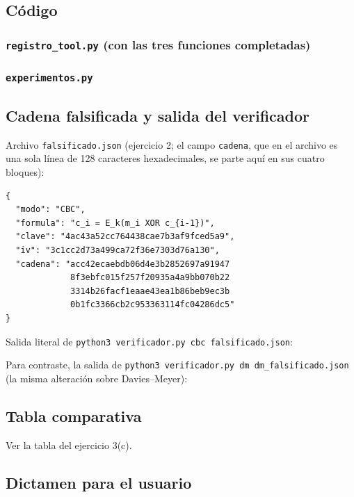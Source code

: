 \documentclass[11pt,letterpaper]{article}
\begin{document}
\subsection{Código}
\subsubsection*{\texttt{registro\_tool.py} (con las tres funciones completadas)}


\subsubsection*{\texttt{experimentos.py}}


\subsection{Cadena falsificada y salida del verificador}
Archivo \texttt{falsificado.json} (ejercicio 2; el campo \texttt{cadena}, que en el archivo es una sola
línea de 128 caracteres hexadecimales, se parte aquí en sus cuatro bloques):
\begin{lstlisting}[style=salida]
{
  "modo": "CBC",
  "formula": "c_i = E_k(m_i XOR c_{i-1})",
  "clave": "4ac43a52cc764438cae7b3af9fced5a9",
  "iv": "3c1cc2d73a499ca72f36e7303d76a130",
  "cadena": "acc42ecaebdb06d4e3b2852697a91947
             8f3ebfc015f257f20935a4a9bb070b22
             3314b26facf1eaae43ea1b86beb9ec3b
             0b1fc3366cb2c953363114fc04286dc5"
}
\end{lstlisting}
Salida literal de \texttt{python3 verificador.py cbc falsificado.json}:


Para contraste, la salida de \texttt{python3 verificador.py dm dm\_falsificado.json} (la misma alteración sobre
Davies--Meyer):


\subsection{Tabla comparativa}
Ver la tabla del ejercicio 3(c).

\subsection{Dictamen para el usuario}
\end{document}
